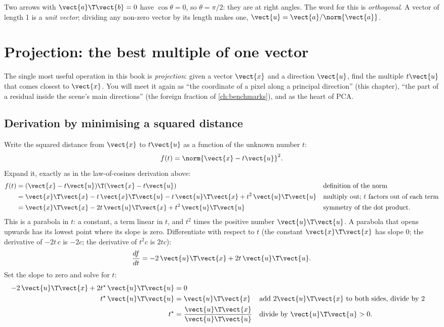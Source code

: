 Two arrows with $\vect{a}\T\vect{b} = 0$ have $\cos\theta = 0$, so $\theta = \pi/2$: they are at
right angles. The word for this is \emph{orthogonal}. A vector of length 1 is
a \emph{unit vector}; dividing any non-zero vector by its length makes one,
$\vect{u} = \vect{a}/\norm{\vect{a}}$.

\section{Projection: the best multiple of one vector}\label{sec:linalg:projection}

The single most useful operation in this book is \emph{projection}: given a vector $\vect{x}$
and a direction $\vect{u}$, find the multiple $t\vect{u}$ that comes closest to $\vect{x}$. You
will meet it again as ``the coordinate of a pixel along a principal direction'' (this chapter),
``the part of a residual inside the scene's main directions'' (the foreign fraction of
\cref{ch:benchmarks}), and as the heart of PCA.

\subsection{Derivation by minimising a squared distance}

Write the squared distance from $\vect{x}$ to $t\vect{u}$ as a function of the unknown number
$t$:
\[
f(t) = \norm{\vect{x} - t\vect{u}}^2 .
\]
Expand it, exactly as in the law-of-cosines derivation above:
\begin{align}
f(t) &= (\vect{x} - t\vect{u})\T(\vect{x} - t\vect{u})
  && \text{definition of the norm} \notag\\
&= \vect{x}\T\vect{x} - t\,\vect{x}\T\vect{u} - t\,\vect{u}\T\vect{x} + t^2\,\vect{u}\T\vect{u}
  && \text{multiply out; $t$ factors out of each term} \notag\\
&= \vect{x}\T\vect{x} - 2t\,\vect{u}\T\vect{x} + t^2\,\vect{u}\T\vect{u}
  && \text{symmetry of the dot product.} \label{eq:linalg:ft}
\end{align}
This is a parabola in $t$: a constant, a term linear in $t$, and $t^2$ times the positive number
$\vect{u}\T\vect{u}$. A parabola that opens upwards has its lowest point where its slope is
zero. Differentiate with respect to $t$ (the constant $\vect{x}\T\vect{x}$ has slope 0; the
derivative of $-2t\,c$ is $-2c$; the derivative of $t^2 c$ is $2tc$):
\[
\frac{df}{dt} = -2\,\vect{u}\T\vect{x} + 2t\,\vect{u}\T\vect{u}.
\]
Set the slope to zero and solve for $t$:
\begin{align}
-2\,\vect{u}\T\vect{x} + 2t^\star\,\vect{u}\T\vect{u} &= 0 \notag\\
t^\star\,\vect{u}\T\vect{u} &= \vect{u}\T\vect{x}
  && \text{add $2\vect{u}\T\vect{x}$ to both sides, divide by 2} \notag\\
t^\star &= \frac{\vect{u}\T\vect{x}}{\vect{u}\T\vect{u}}
  && \text{divide by $\vect{u}\T\vect{u} > 0$.} \label{eq:linalg:tstar}
\end{align}

